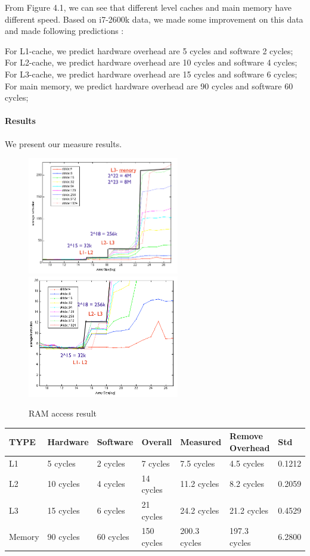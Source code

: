 From Figure 4.1, we can see that different level caches and main memory have different speed.  Based on i7-2600k data, we made some improvement on this data and made following predictions : 

For L1-cache, we predict hardware overhead are 5 cycles and software 2 cycles;
For L2-cache, we predict hardware overhead are 10 cycles and software 4 cycles;
For L3-cache, we predict hardware overhead are 15 cycles and software 6 cycles;
For main memory, we predict hardware overhead are 90 cycles and software 60 cycles;

\paragraph{Results}
We present our measure results.

\begin {figure}
\centering
\includegraphics[width=2.6in]{./pics/ram1.png}
\includegraphics[width=2.6in]{./pics/ram2.png}
\caption{RAM access result}\label{RAM access}
\end{figure}

\begin{center}
\begin{tabular}{| p{1.5cm} | p{2cm} | p{2cm} | p{2cm} | p{2.5cm} | p{3cm} | p{2cm}}
TYPE             & Hardware  & Software  & Overall  & Measured  & Remove Overhead & Std\\
\hline

L1	&   5 cycles  & 2 cycles & 7 cycles  &  7.5  cycles &  4.5 cycles & 0.1212\\
L2    &   10 cycles & 4 cycles & 14 cycles & 11.2 cycles &  8.2 cycles & 0.2059\\
L3 	&   15 cycles & 6 cycles & 21 cycles &  24.2 cycles & 21.2 cycles & 0.4529\\
Memory & 90 cycles & 60 cycles & 150 cycles & 200.3 cycles & 197.3 cycles & 6.2800\\
\end{tabular}
\end{center}

